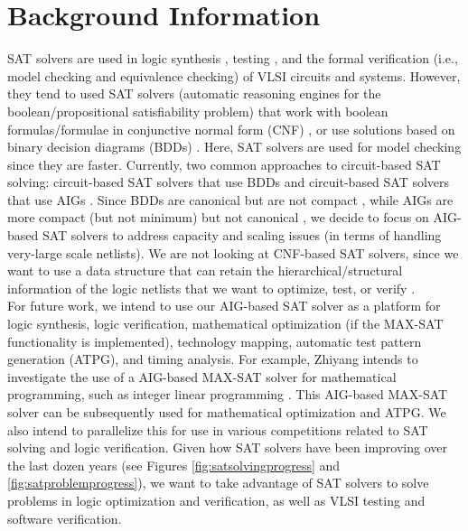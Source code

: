 \documentclass[letter,12pt]{article}
\begin{document}
\section{Background Information}
\label{sec:backgroundinfo}

SAT solvers are used in logic synthesis \cite{Mishchenko2007,Scheffer2006a}, testing \cite{Drechsler2009}, and the formal verification (i.e., model checking and equivalence checking) \cite{Chang2007a,Drechsler2004,Hassoun2002,Herbstritt2008,Scheffer2006a,Wang2009,Yuan2006} of VLSI circuits and systems. However, they tend to used SAT solvers (automatic reasoning engines for the boolean/propositional satisfiability problem) that work with boolean formulas/formulae in conjunctive normal form (CNF) \cite{Marek2009}, or use solutions based on binary decision diagrams (BDDs) \cite{Chang2007a,Scheffer2006a}. Here, SAT solvers are used for model checking since they are faster. Currently, two common approaches to circuit-based SAT solving: circuit-based SAT solvers that use BDDs and circuit-based SAT solvers that use AIGs \cite[\S5.2, pp. 64--67]{Drechsler2004}. Since BDDs are canonical but are not compact \cite{Hassoun2002,Wang2009}, while AIGs are more compact (but not minimum) but not canonical \cite[pp. 22, Table 2.4]{Herbstritt2008}, we decide to focus on AIG-based SAT solvers to address capacity and scaling issues (in terms of handling very-large scale netlists). We are not looking at CNF-based SAT solvers, since we want to use a data structure that can retain the hierarchical/structural information of the logic netlists that we want to optimize, test, or verify \cite[pp. 22, Table 2.4]{Herbstritt2008}\cite{Drechsler2009}. \\

For future work, we intend to use our AIG-based SAT solver as a platform for logic synthesis, logic verification, mathematical optimization (if the MAX-SAT functionality is implemented), technology mapping, automatic test pattern generation (ATPG), and timing analysis. For example, Zhiyang intends to investigate the use of a AIG-based MAX-SAT solver for mathematical programming, such as integer linear programming \cite[Chapter 11, pp. 191]{Yuan2006}. This AIG-based MAX-SAT solver can be subsequently used for mathematical optimization and ATPG. We also intend to parallelize this for use in various competitions related to SAT solving and logic verification. Given how SAT solvers have been improving over the last dozen years (see Figures \ref{fig:satsolvingprogress} and \ref{fig:satproblemprogress}), we want to take advantage of SAT solvers to solve problems in logic optimization and verification, as well as VLSI testing and software verification.
\end{document}
